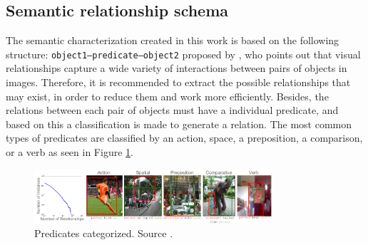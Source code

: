 \subsection{Semantic relationship schema}
The semantic characterization created in this work is based on the following 
structure: \texttt{object1--predicate--object2} proposed by \cite{Cewu}, who 
points out that visual relationships capture a wide variety of interactions 
between pairs of objects in images. Therefore, it is recommended to extract the 
possible relationships that may exist, in order to reduce them and work more 
efficiently. Besides, the relations between each pair of objects must 
have a individual predicate, and based on this a classification is made 
to generate a relation. The most common types of predicates are classified 
by an action, space, a preposition, a comparison, or a verb as seen in Figure 
\ref{fig:predaCar}.

\begin{figure}[H]
    \centering
    \includegraphics[width=8.8cm]{figures/predica.png}
    \caption{Predicates categorized. Source \cite{Cewu}.}
    \label{fig:predaCar}
\end{figure}

